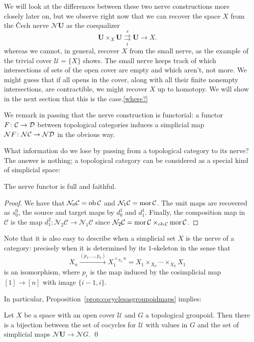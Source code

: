 \documentclass[a4paper,openany]{scrbook}
\renewcommand{\C}{\mathcal C}
\newcommand{\nerve}{\mathcal N}
\begin{document}
We will look at the differences between these two nerve constructions more closely later on, but we observe right now that we can recover the space $X$ from the \v Cech nerve $\nerve\mathbf U$ as the coequalizer
\[
\mathbf U \times_X \mathbf U \overset{s}{\underset{t}{\rightrightarrows}} \mathbf U \to X.
\]
whereas we cannot, in general, recover $X$ from the small nerve, as the example of the trivial cover $\mathcal U = \{X\}$ shows. The small nerve keeps track of which intersections of sets of the open cover are empty and which aren't, not more. We might guess that if all opens in the cover, along with all their finite nonempty intersections, are contractible, we might recover $X$ up to homotopy. We will show in the next section that this is the case.\ref{where?}

We remark in passing that the nerve construction is functorial: a functor $F\colon \C \to \D$ between topological categories induces a simplicial map $\nerve F\colon \nerve\C \to \nerve\D$ in the obvious way. 

What information do we lose by passing from a topological category to its nerve? The answer is nothing; a topological category can be considered as a special kind of simplicial space:

\begin{prop}\label{prop:nervefullyfaithful}
The nerve functor is full and faithful. 
\end{prop}
\begin{proof}
We have that $\nerve_0\C = \ob\C$ and $\nerve_1\C = \mor\C$. The unit maps are recovered as $s^0_0$, the source and target maps by $d^1_0$ and $d^1_1$. Finally, the composition map in $\C$ is the map $d^2_1\colon \nerve_2\C \to \nerve_1\C$ since $\nerve_2\C = \mor\C \times_{\ob\C} \mor\C$.
\end{proof}

Note that it is also easy to describe when a simplicial set $X$ is the nerve of a category: precisely when it is determined by its $1$-skeleton in the sense that
\[
X_n \xrightarrow{(p_1,\dots,p_n)} X_1^{\times_{X_0} n} = X_1 \times_{X_0} \cdots \times_{X_0} X_1
\]
is an isomorphism, where $p_i$ is the map induced by the cosimplicial map $[1] \to [n]$ with image $\{i-1,i\}$.

In particular, Proposition~\ref{prop:cocyclesasgroupoidmaps} implies:

\begin{corollary}
Let $X$ be a space with an open cover $\mathcal U$ and $G$ a topological groupoid. Then there is a bijection between the set of cocycles for $\mathcal U$ with values in $G$ and the set of simplicial maps $\nerve \mathbf U \to \nerve G$. \qed
\end{corollary}
\end{document}
